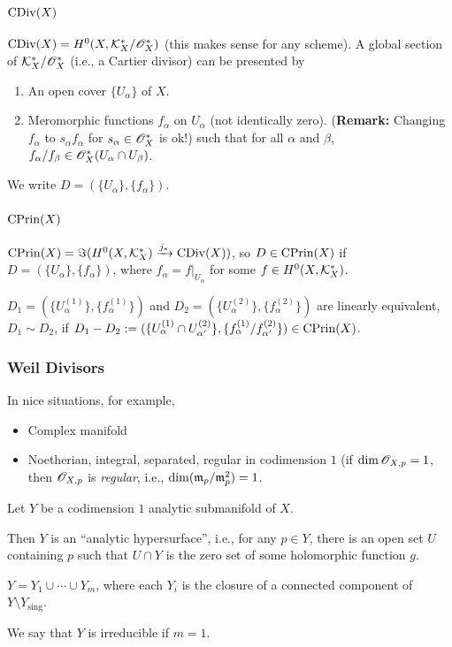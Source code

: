 \subsubsection{$\operatorname{CDiv}(X)$}
$\operatorname{CDiv}(X) = H^0(X,\mathcal{K}^*_X/\mathscr{O}^*_X)$ (this makes sense for any scheme). A global section of $\mathcal{K}^*_X/\mathscr{O}^*_X$ (i.e., a Cartier divisor) can be presented by
\begin{enumerate}
\item An open cover $\{U_\alpha\}$ of $X$.
\item Meromorphic functions $f_\alpha$ on $U_\alpha$ (not identically zero). (\textbf{Remark:} Changing $f_\alpha$ to $s_\alpha f_\alpha$ for $s_\alpha \in \mathscr{O}_X^*$ is ok!) such that for all $\alpha$ and $\beta$, $f_\alpha/f_\beta \in \mathscr{O}_X^*(U_\alpha\cap U_\beta)$.
\end{enumerate}
We write $D = (\{U_\alpha\}, \{f_\alpha\})$.
\subsubsection{$\operatorname{CPrin}(X)$}
$\operatorname{CPrin}(X) = \Im(H^0(X,\mathcal{K}^*_X) \xrightarrow{j_*} \operatorname{CDiv}(X))$, so $D \in \operatorname{CPrin}(X)$ if $D = (\{U_\alpha\}, \{f_\alpha\})$, where $f_\alpha = f|_{U_\alpha}$ for some $f \in H^0(X,\mathcal{K}^*_X)$.

\begin{definition} 
 $D_1 = (\{U_\alpha^{(1)}\}, \{f_\alpha^{(1)}\})$ and $D_2 = (\{U_\alpha^{(2)}\}, \{f_\alpha^{(2)}\})$ are linearly equivalent, $D_1 \sim D_2$, if $D_1 - D_2 := (\{U_\alpha ^{(1)}\cap U_{\alpha'}^{(2)}\}, \{f_\alpha^{(1)}/f_{\alpha'}^{(2)}\})\in \operatorname{CPrin}(X)$. 
\end{definition}

\subsubsection{Weil Divisors}
In nice situations, for example, 
\begin{itemize}
\item Complex manifold
\item Noetherian, integral, separated, regular in codimension $1$ (if $\dim \mathscr{O}_{X,p} = 1$, then $\mathscr{O}_{X,p}$ is \emph{regular}, i.e., $\dim(\mathfrak{m}_p/\mathfrak{m}_p^2) = 1$.
\end{itemize}
Let $Y$ be a codimension $1$ analytic submanifold of $X$.
\begin{fact}
  Then $Y$ is an ``analytic hypersurface'', i.e., for any $p \in Y$, there is an open set $U$ containing $p$ such that $U\cap Y$ is the zero set of some holomorphic function $g$. 

$Y = Y_1 \cup \dotsb \cup Y_m$, where each $Y_i$ is the closure of a connected component of $Y\setminus Y_{\text{sing}}$. 

We say that $Y$ is irreducible if $m = 1$.
\end{fact}

